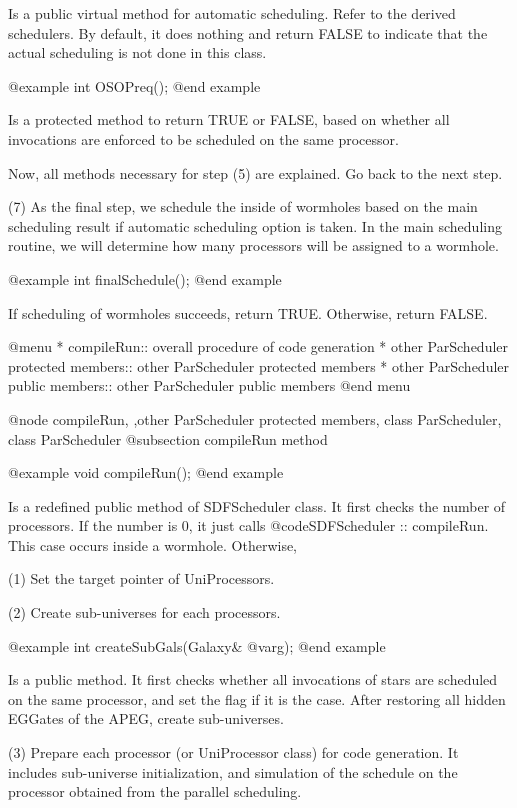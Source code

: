 Is a public virtual method for automatic scheduling. Refer to the derived
schedulers. By default, it does nothing and return FALSE to indicate that
the actual scheduling is not done in this class.

@example
int OSOPreq();
@end example

Is a protected method to return TRUE or FALSE, based on whether all
invocations are enforced to be scheduled on the same processor.

Now, all methods necessary for step (5) are explained. Go back to the next
step.

(7) As the final step, we schedule the inside of wormholes based on the
main scheduling result if automatic scheduling option is taken. 
In the main scheduling routine, we will determine
how many processors will be assigned to a wormhole.

@example
int finalSchedule();
@end example

If scheduling of wormholes succeeds, return TRUE. Otherwise, return FALSE.

@menu
* compileRun::				  overall procedure of code generation
* other ParScheduler protected members::  other ParScheduler protected members
* other ParScheduler public members::	  other ParScheduler public members
@end menu

@node compileRun, ,other ParScheduler protected members, class ParScheduler, class ParScheduler
@subsection compileRun method

@example
void compileRun();
@end example

Is a redefined public method of SDFScheduler class. It first checks the number
of processors. 
If the number is 0, it just calls @code{SDFScheduler :: compileRun}. This
case occurs inside a wormhole. Otherwise, 

(1) Set the target pointer of UniProcessors.

(2) Create sub-universes for each processors.

@example
int createSubGals(Galaxy& @var{g});
@end example

Is a public method. It first checks whether all invocations of stars are
scheduled on the same processor, and set the flag if it is the case.
After restoring all hidden EGGates of the APEG, create sub-universes.

(3) Prepare each processor (or UniProcessor class) for code generation.
It includes sub-universe initialization, and simulation of the schedule on
the processor obtained from the parallel scheduling.

